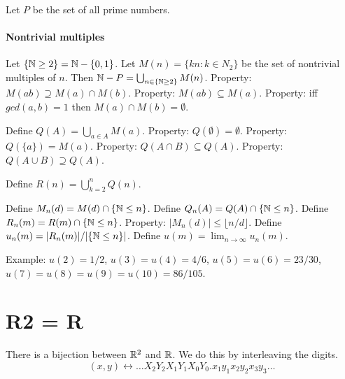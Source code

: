 Let \(P\) be the set of all prime numbers.

\paragraph{Nontrivial multiples}
Let \(\{\mathbb{N}\ge 2\} = \mathbb{N} - \{0,1\}\).
Let \(M(n) = \{ k n : k \in N_2 \}\) be the set of nontrivial multiples of \(n\).
Then \( \mathbb{N} - P = \bigcup_{n \in \{\mathbb{N}\ge 2\}} M(n) \).
Property: \(M(ab) \supseteq M(a) \cap M(b)\).
Property: \(M(ab) \subseteq M(a)\).
Property: iff \(gcd(a,b)=1\) then \(M(a) \cap M(b) = \emptyset\).

Define \(Q(A) = \bigcup_{a \in A} M(a)\).
Property: \(Q(\emptyset) = \emptyset\).
Property: \(Q(\{a\}) = M(a)\).
Property: \(Q(A \cap B) \subseteq Q(A)\).
Property: \(Q(A \cup B) \supseteq Q(A)\).

Define \(R(n) = \bigcup_{k=2}^n Q(n)\).

Define \(M_n(d) = M(d) \cap \{\mathbb{N} \le n\}\).
Define \(Q_n(A) = Q(A) \cap \{\mathbb{N} \le n\}\).
Define \(R_n(m) = R(m) \cap \{\mathbb{N} \le n\}\).
Property: \(|M_n(d)| \le \lfloor n/d \rfloor\).
Define \(u_n(m) = |R_n(m)| / |\{\mathbb{N} \le n\}|\).
Define \(u(m) = \lim_{n \to \infty} u_n(m)\).

Example: \(u(2) = 1/2\), \(u(3) = u(4) = 4/6\), \(u(5) = u(6) = 23/30\), \(u(7) = u(8) = u(9) = u(10) = 86/105\).

\section{R2 = R}

There is a bijection between \(\mathbb{R}^2\) and \(\mathbb{R}\).
We do this by interleaving the digits.
\[
    (x, y) \leftrightarrow \ldots X_2 Y_2 X_1 Y_1 X_0 Y_0 . x_1 y_1 x_2 y_2 x_3 y_3 \ldots
\]
